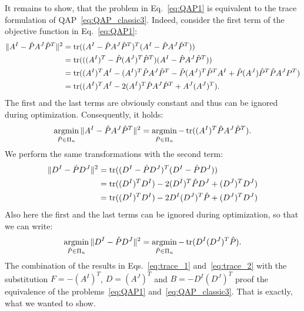 It remains to show, that the problem in Eq.~\eqref{eq:QAP1} is equivalent to the trace formulation of QAP~\eqref{eq:QAP_classic3}. Indeed, consider the first term of the objective function in Eq.~\eqref{eq:QAP1}:
\begin{align*}
\|A^I-\hat{P}A^J\hat{P}^T\|^2 &= \mathop{\rm tr}((A^I-\hat{P}A^J\hat{P}^T)^T(A^I-\hat{P}A^J\hat{P}^T)) \notag\\
							  &= \mathop{\rm tr}(((A^I)^T-\hat{P}(A^J)^T\hat{P}^T)(A^I-\hat{P}A^J\hat{P}^T)) \notag\\
							  &= \mathop{\rm tr}((A^I)^TA^I-(A^I)^T\hat{P}A^J\hat{P}^T-\hat{P}(A^J)^T\hat{P}^TA^I+\hat{P}(A^J)\hat{P}^T\hat{P}A^JP^T) \notag\\
							  &= \mathop{\rm tr}((A^I)^TA^I-2(A^I)^T\hat{P}A^J\hat{P}^T+A^J(A^J)^T).
\end{align*}
The first and the last terms are obviously constant and thus can be ignored during optimization. Consequently, it holds:
\begin{equation}\label{eq:trace_1}
\mathop{\rm argmin}_{\hat{P}\in\Pi_n}\|A^I-\hat{P}A^J\hat{P}^T\|^2 = \mathop{\rm argmin}_{\hat{P}\in\Pi_n}-\mathop{\rm tr}((A^I)^T\hat{P}A^J\hat{P}^T).
\end{equation}
We perform the same transformations with the second term:
\begin{align*}
\|D^I-\hat{P}D^J\|^2 &= \mathop{\rm tr}((D^I-\hat{P}D^J)^T(D^I-\hat{P}D^J)) \notag\\
					 &= \mathop{\rm tr}((D^I)^TD^I)-2(D^I)^T\hat{P}D^J+(D^J)^TD^J) \notag\\
					 &= \mathop{\rm tr}((D^I)^TD^I)-2D^I(D^J)^T\hat{P}+(D^J)^TD^J) 
\end{align*} 
Also here the first and the last terms can be ignored during optimization, so that we can write:
\begin{equation}\label{eq:trace_2}
\mathop{\rm argmin}_{\hat{P}\in\Pi_n}\|D^I-\hat{P}D^J\|^2=\mathop{\rm argmin}_{\hat{P}\in\Pi_n}-\mathop{\rm tr}(D^I(D^J)^T\hat{P}).
\end{equation}
The combination of the results in Eqs.~\eqref{eq:trace_1} and~\eqref{eq:trace_2} with the substitution $F=-(A^I)^T$, $D=(A^J)^T$ and $B=-D^I(D^J)^T$ proof the equivalence of the problems~\eqref{eq:QAP1} and~\eqref{eq:QAP_classic3}. That is exactly, what we wanted to show.



